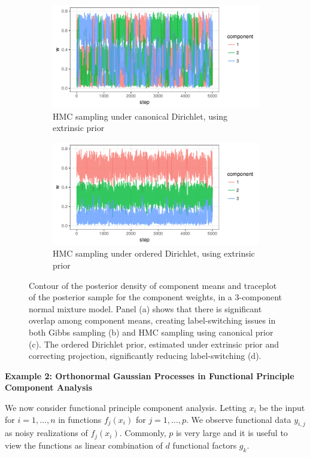 \documentclass[10pt]{article}
\newcommand{\leo}[1]{{\color{blue}{\it leo: #1}}}
\DeclareMathOperator{\1}{\mathbbm{1}}
\begin{document}
\begin{figure}[H]
\begin{subfigure}[b]{0.32\textwidth}
  \includegraphics[width=1\textwidth]{fmm_w_hmc_unordered.pdf}
    \caption{HMC sampling under canonical Dirichlet, using extrinsic prior}
      \end{subfigure}
       \begin{subfigure}[b]{0.32\textwidth}
 \includegraphics[width=1\textwidth]{fmm_w_hmc.pdf}
     \caption{HMC sampling under ordered Dirichlet, using extrinsic prior}
     \end{subfigure}
\caption{Contour of the posterior density of component means and traceplot of the posterior sample for the component weights, in a 3-component normal mixture model. Panel (a) shows that there is significant overlap among component means, creating label-switching issues in both Gibbs sampling (b) and HMC sampling using canonical prior (c). The ordered Dirichlet prior, estimated under extrinsic prior and correcting projection, significantly reducing label-switching (d).}
\label{dirichlet}
\end{figure}


{\bf Example 2: Orthonormal Gaussian Processes in Functional Principle Component Analysis}

\leo{There are some issues with this model. Skip it for now.}

We now consider functional principle component analysis. Letting $x_i$ be the input for $i=1,\ldots,n$ in functions $f_j(x_i)$ for $j=1,\ldots,p$. We observe functional data $y_{i,j}$ as noisy realizations of $f_j(x_i)$. Commonly, $p$ is very large and it is useful to view the functions as linear combination of $d$ functional factors $g_k$.
\end{document}
